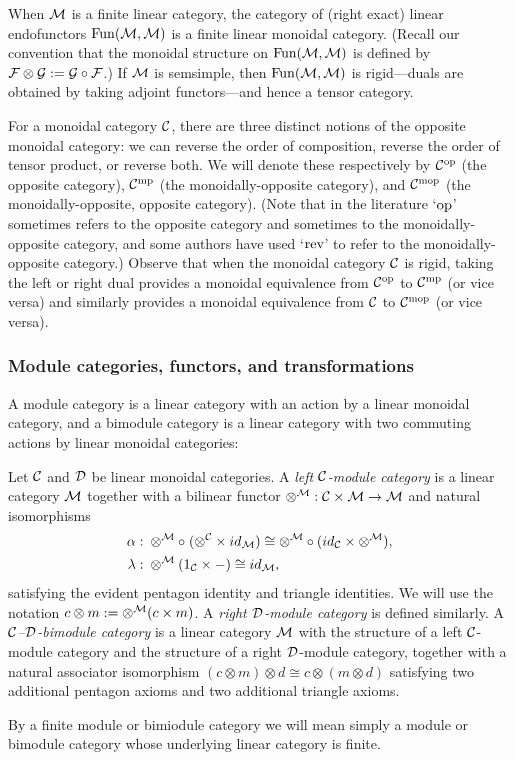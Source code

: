 \documentclass{amsart}
\begin{document}
\begin{example}
When $\mathcal M$ is a finite linear category, the category of (right exact) linear endofunctors $\operatorname{Fun}(\mathcal M,\mathcal M)$ is a finite linear monoidal category.  (Recall our convention that the monoidal structure on $\operatorname{Fun}(\mathcal M,\mathcal M)$ is defined by $\mathcal F \otimes \mathcal G := \mathcal G \circ \mathcal F$.)  If $\mathcal M$ is semsimple, then $\operatorname{Fun}(\mathcal M,\mathcal M)$ is rigid---duals are obtained by taking adjoint functors---and hence a tensor category.
\end{example} %

For a monoidal category $\mathcal C$, there are three distinct notions of the opposite monoidal category: we can reverse the order of composition, reverse the order of tensor product, or reverse both.  We will denote these respectively by $\mathcal C^{\mathrm{op}}$ (the opposite category), $\mathcal C^{\mathrm{mp}}$ (the monoidally-opposite category), and $\mathcal C^{\mathrm{mop}}$ (the monoidally-opposite, opposite category).  (Note that in the literature `$\mathrm{op}$' sometimes refers to the opposite category and sometimes to the monoidally-opposite category, and some authors have used `$\mathrm{rev}$' to refer to the monoidally-opposite category.)  Observe that when the monoidal category $\mathcal C$ is rigid, taking the left or right dual provides a monoidal equivalence from $\mathcal C^{\mathrm{op}}$ to $\mathcal C^{\mathrm{mp}}$ (or vice versa) and similarly provides a monoidal equivalence from $\mathcal C$ to $\mathcal C^{\mathrm{mop}}$ (or vice versa).

\subsubsection{Module categories, functors, and transformations}

A module category is a linear category with an action by a linear monoidal category, and a bimodule category is a linear category with two commuting actions by linear monoidal categories:
\begin{definition}
Let $\mathcal C$ and $\mathcal D$ be linear monoidal categories.
A \emph{left $\mathcal C$-module category} is a linear category $\mathcal M$ together with a bilinear functor $\otimes^{\mathcal M}: \mathcal C \times \mathcal M \to \mathcal M$ and natural isomorphisms
\begin{align*}
		\alpha: & \;    \otimes^{\mathcal M} \circ \; (\otimes^{\mathcal C} \times id_{\mathcal M}) \cong  \otimes^{\mathcal M} \circ (id_{\mathcal C} \times \otimes^{\mathcal M}), \\
		\lambda: & \; \otimes^{\mathcal M} (1_{\mathcal C} \times -) \cong id_{\mathcal M},
\end{align*}
satisfying the evident pentagon identity and triangle identities.  We will use the notation $c \otimes m := \otimes^\mathcal M(c \times m)$.  A \emph{right $\mathcal D$-module category} is defined similarly.  A \emph{$\mathcal C$--$\mathcal D$-bimodule category} is a linear category $\mathcal M$ with the structure of a left $\mathcal C$-module category and the structure of a right $\mathcal D$-module category, together with a natural associator isomorphism $(c \otimes m) \otimes d \cong c \otimes (m \otimes d)$ satisfying two additional pentagon axioms and two additional triangle axioms.  
\end{definition}
\nid By a finite module or bimiodule category we will mean simply a module or bimodule category whose underlying linear category is finite.
\end{document}
